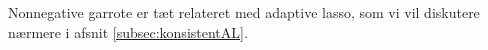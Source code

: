 Nonnegative garrote er tæt relateret med adaptive lasso, som vi vil diskutere nærmere i afsnit \ref{subsec:konsistentAL}.

%
%
